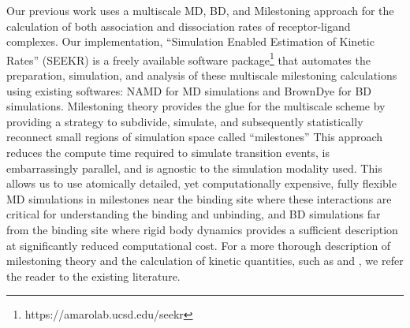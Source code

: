 \par Our previous work uses a multiscale MD, BD, and Milestoning approach for 
the calculation of both association and dissociation rates of receptor-ligand 
complexes\cite{Votapka2015,Votapka2017}. Our implementation, %
``Simulation Enabled Estimation 
of Kinetic Rates'' (SEEKR) 
is a freely available software package\footnote{https://amarolab.ucsd.edu/seekr} that automates the preparation, 
simulation, and analysis of these multiscale milestoning calculations using 
existing softwares: NAMD\cite{Phillips2005} for MD simulations and 
BrownDye\cite{Huber2010} for BD simulations. 
Milestoning theory
provides the glue for the multiscale scheme by providing a strategy to subdivide,
simulate, and subsequently statistically reconnect small regions of simulation 
space called ``milestones''\cite{Faradjian2004,Shalloway2006,West2007,Vanden-Eijnden2008,
Vanden-Eijnden2009,Majek2010,Kirmizialtin2011,Cardenas2013,Cardenas2015,
Bello-Rivas2015,Votapka2015,Votapka2017,Elber2017} This approach reduces the compute time required to simulate transition events, is embarrassingly parallel, and is agnostic to the simulation modality used. %
This allows us to use atomically detailed, yet computationally expensive, 
fully flexible MD simulations in milestones near the binding site where these 
interactions are critical for understanding the binding and unbinding, and BD 
simulations far from the binding site where rigid body dynamics provides a 
sufficient description at significantly reduced computational cost. For a more 
thorough description of milestoning theory and the calculation of kinetic 
quantities, such as \kon and \koff, we refer the reader to the existing 
literature.\cite{Faradjian2004,Shalloway2006,West2007,Vanden-Eijnden2008,
Vanden-Eijnden2009,Majek2010,Kirmizialtin2011,Cardenas2013,Cardenas2015,
Bello-Rivas2015,Votapka2015,Votapka2017,Elber2017} 

